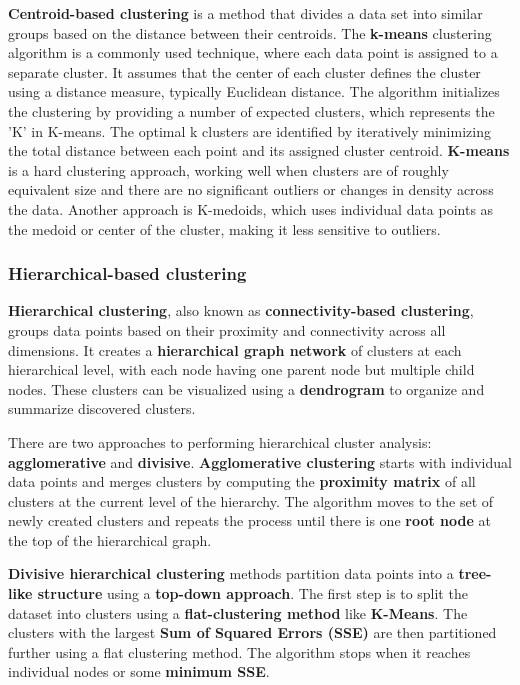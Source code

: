\par \textbf{Centroid-based clustering } is a method that divides a data set into similar groups based on the distance between their centroids. The \textbf{k-means} clustering algorithm is a commonly used technique, where each data point is assigned to a separate cluster. It assumes that the center of each cluster defines the cluster using a distance measure, typically Euclidean distance. The algorithm initializes the clustering by providing a number of expected clusters, which represents the 'K' in K-means. The optimal k clusters are identified by iteratively minimizing the total distance between each point and its assigned cluster centroid. \textbf{K-means} is a hard clustering approach, working well when clusters are of roughly equivalent size and there are no significant outliers or changes in density across the data. Another approach is K-medoids, which uses individual data points as the medoid or center of the cluster, making it less sensitive to outliers.

\subsubsection{Hierarchical-based clustering}

\par \textbf{Hierarchical clustering}, also known as \textbf{connectivity-based clustering}, groups data points based on their proximity and connectivity across all dimensions. It creates a \textbf{hierarchical graph network} of clusters at each hierarchical level, with each node having one parent node but multiple child nodes. These clusters can be visualized using a \textbf{dendrogram} to organize and summarize discovered clusters.

There are two approaches to performing hierarchical cluster analysis: \textbf{agglomerative} and \textbf{divisive}. \textbf{Agglomerative clustering} starts with individual data points and merges clusters by computing the \textbf{proximity matrix} of all clusters at the current level of the hierarchy. The algorithm moves to the set of newly created clusters and repeats the process until there is one \textbf{root node} at the top of the hierarchical graph.

\textbf{Divisive hierarchical clustering} methods partition data points into a \textbf{tree-like structure} using a \textbf{top-down approach}. The first step is to split the dataset into clusters using a \textbf{flat-clustering method} like \textbf{K-Means}. The clusters with the largest \textbf{Sum of Squared Errors (SSE)} are then partitioned further using a flat clustering method. The algorithm stops when it reaches individual nodes or some \textbf{minimum SSE}.

